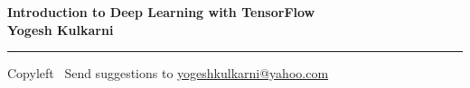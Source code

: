 
\graphicspath{{images/}}



\footnotesize


\begin{center}
\Large{\textbf{Introduction to Deep Learning with TensorFlow\\ Yogesh Kulkarni}}  
\end{center}

\begin{multicols}{2}

\end{multicols}

\rule{\linewidth}{0.25pt}
\scriptsize
Copyleft \textcopyleft\  Send suggestions to 
\href{http://www.yogeshkulkarni.com}{yogeshkulkarni@yahoo.com}


